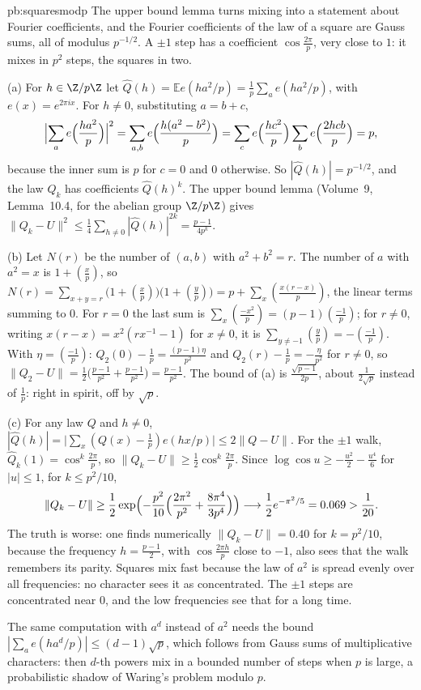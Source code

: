 \begin{solution}{pb:squaresmodp}
\idea The upper bound lemma turns mixing into a statement about Fourier coefficients, and the Fourier coefficients of the law of a square are Gauss sums, all of
modulus $p^{-1/2}$. A $\pm1$ step has a coefficient $\cos\frac{2\pi}p$, very close to $1$: it mixes in $p^2$ steps, the squares in two.

\writeup (a) For $h\in\Z/p\Z$ let $\hat Q(h)=\mathbb Ee(ha^2/p)=\frac1p\sum_ae(ha^2/p)$, with $e(x)=e^{2\pi ix}$. For $h\ne0$, substituting $a=b+c$,
\[
\Bigl|\sum_ae\Bigl(\frac{ha^2}p\Bigr)\Bigr|^2=\sum_{a,b}e\Bigl(\frac{h(a^2-b^2)}p\Bigr)=\sum_c e\Bigl(\frac{hc^2}p\Bigr)\sum_be\Bigl(\frac{2hcb}p\Bigr)=p,
\]
because the inner sum is $p$ for $c=0$ and $0$ otherwise. So $|\hat Q(h)|=p^{-1/2}$, and the law $Q_k$ has coefficients $\hat Q(h)^k$. The upper bound lemma (Volume~9,
Lemma~10.4, for the abelian group $\Z/p\Z$) gives $\|Q_k-U\|^2\le\frac14\sum_{h\ne0}|\hat Q(h)|^{2k}=\frac{p-1}{4p^k}$.

(b) Let $N(r)$ be the number of $(a,b)$ with $a^2+b^2=r$. The number of $a$ with $a^2=x$ is $1+\left(\frac xp\right)$, so
$N(r)=\sum_{x+y=r}\bigl(1+(\frac xp)\bigr)\bigl(1+(\frac yp)\bigr)=p+\sum_x\left(\frac{x(r-x)}p\right)$, the linear terms summing to $0$. For $r=0$ the last sum is
$\sum_x\left(\frac{-x^2}p\right)=(p-1)\left(\frac{-1}p\right)$; for $r\ne0$, writing $x(r-x)=x^2(rx^{-1}-1)$ for $x\ne0$, it is $\sum_{y\ne-1}\left(\frac yp\right)=-\left(\frac{-1}p\right)$.
With $\eta=\left(\frac{-1}p\right)$: $Q_2(0)-\frac1p=\frac{(p-1)\eta}{p^2}$ and $Q_2(r)-\frac1p=-\frac\eta{p^2}$ for $r\ne0$, so
$\|Q_2-U\|=\frac12\bigl(\frac{p-1}{p^2}+\frac{p-1}{p^2}\bigr)=\frac{p-1}{p^2}$. The bound of (a) is $\frac{\sqrt{p-1}}{2p}$, about $\frac1{2\sqrt p}$ instead of $\frac1p$: right in spirit, off
by $\sqrt p$.

(c) For any law $Q$ and $h\ne0$, $|\hat Q(h)|=\bigl|\sum_x(Q(x)-\frac1p)e(hx/p)\bigr|\le2\|Q-U\|$. For the $\pm1$ walk, $\hat Q_k(1)=\cos^k\frac{2\pi}p$, so
$\|Q_k-U\|\ge\frac12\cos^k\frac{2\pi}p$. Since $\log\cos u\ge-\frac{u^2}2-\frac{u^4}6$ for $|u|\le1$, for $k\le p^2/10$,
\[
\|Q_k-U\|\ge\frac12\exp\Bigl(-\frac{p^2}{10}\Bigl(\frac{2\pi^2}{p^2}+\frac{8\pi^4}{3p^4}\Bigr)\Bigr)\longrightarrow\frac12e^{-\pi^2/5}=0.069>\frac1{20}.
\]
The truth is worse: one finds numerically $\|Q_k-U\|=0.40$ for $k=p^2/10$, because the frequency $h=\frac{p-1}2$, with $\cos\frac{2\pi h}p$ close to $-1$, also sees that the
walk remembers its parity.
Squares mix fast because the law of $a^2$ is spread evenly over all frequencies: no character sees it as concentrated. The $\pm1$ steps are concentrated near $0$, and
the low frequencies see that for a long time.

\leads The same computation with $a^d$ instead of $a^2$ needs the bound $|\sum_ae(ha^d/p)|\le(d-1)\sqrt p$, which follows from Gauss sums of multiplicative
characters: then $d$-th powers mix in a bounded
number of steps when $p$ is large, a probabilistic shadow of Waring's problem modulo $p$.
\end{solution}

